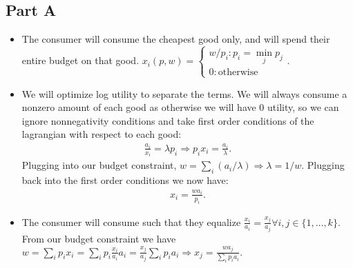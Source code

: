 \documentclass[11pt]{article} %
\begin{document}
\subsection{Part A}
\begin{itemize}
\item 
The consumer will consume the cheapest good only, and will spend their entire budget on that good. $x_i(p,w) = \begin{cases}w/p_i: p_i = \min\limits_j p_j\\ 0: \text{otherwise}\end{cases}.$
\item
We will optimize log utility to separate the terms. We will always consume a nonzero amount of each good as otherwise we will have 0 utility, so we can ignore nonnegativity conditions and take first order conditions of the lagrangian with respect to each good:
\begin{align*}
\frac{a_i}{x_i} = \lambda p_i \Rightarrow p_ix_i = \frac{a_i}{\lambda}.
\end{align*}
Plugging into our budget constraint, $w = \sum_i (a_i/\lambda) \Rightarrow  \lambda = 1/w.$ Plugging back into the first order conditions we now have:
\begin{align*}
x_i = \frac{wa_i}{p_i}.
\end{align*}
\item
The consumer will consume such that they equalize $\frac{x_i}{a_i} = \frac{x_j}{a_j} \forall i,j \in \{1,\dots,k\}.$ From our budget constraint we have $w = \sum_i p_ix_i = \sum_i p_i\frac{x_i}{a_i}a_i = \frac{x_j}{a_j}\sum_i p_ia_i \Rightarrow x_j = \frac{w a_j}{\sum_i p_ia_i}.$
\end{itemize}
\end{document}

